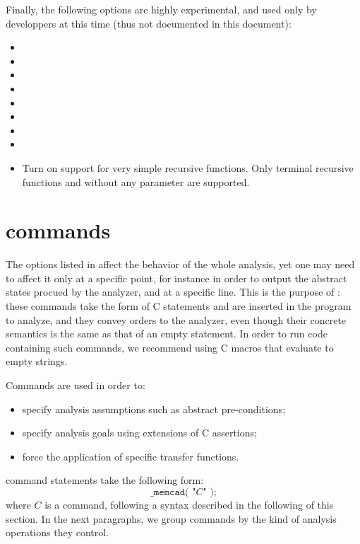 Finally, the following options are highly experimental, and used only
by developpers at this time (thus not documented in this document):
\begin{itemize}
\item[\doption{-type-unfolds}] \optdev
\item[\doption{-part-lfps}] \optdev
\item[\doption{-no-part-lfps}] \optdev
\item[\doption{-sel-widen}] \optdev
\item[\doption{-no-sel-widen}] \optdev
\item[\doption{-no-fast-iir}] \optdev
\item[\doption{-unary-abs}] \optdev
\item[\doption{-no-unary-abs}] \optdev
\item[\doption{-rec-calls}] \optdev
  Turn on support for very simple recursive functions.
  Only terminal recursive functions and without any parameter are
  supported.
\end{itemize}


\section{\memcad commands}
\label{s:3:2:commands}
The options listed in  affect the behavior of the
whole analysis, yet one may need to affect it only at a specific point,
for instance in order to output the abstract states procued by the
analyzer, and at a specific line.
This is the purpose of :
these commands take the form of C statements and are inserted in the
program to analyze, and they convey orders to the analyzer, even though
their concrete semantics is the same as that of an empty statement.
In order to run code containing such commands, we recommend using C
macros that evaluate to empty strings.

Commands are used in order to:
\begin{itemize}
\item specify analysis assumptions such as abstract pre-conditions;
\item specify analysis goals using extensions of C assertions;
\item force the application of specific transfer functions.
\end{itemize}
\memcad command statements take the following form:
\[
\texttt{_memcad( "} C \texttt{" );}
\]
where \( C \) is a command, following a syntax described in the
following of this section.
In the next paragraphs, we group commands by the kind of analysis
operations they control.

